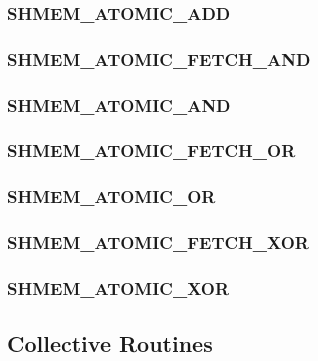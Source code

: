 \documentclass[10pt]{book}
\begin{document}
\subsubsection{\textbf{SHMEM\_ATOMIC\_ADD}}
\label{subsec:shmem_atomic_add}


\subsubsection{\textbf{SHMEM\_ATOMIC\_FETCH\_AND}}
\label{subsec:shmem_atomic_fetch_and}


\subsubsection{\textbf{SHMEM\_ATOMIC\_AND}}
\label{subsec:shmem_atomic_and}


\subsubsection{\textbf{SHMEM\_ATOMIC\_FETCH\_OR}}
\label{subsec:shmem_atomic_fetch_or}


\subsubsection{\textbf{SHMEM\_ATOMIC\_OR}}
\label{subsec:shmem_atomic_or}


\subsubsection{\textbf{SHMEM\_ATOMIC\_FETCH\_XOR}}
\label{subsec:shmem_atomic_fetch_xor}


\subsubsection{\textbf{SHMEM\_ATOMIC\_XOR}}
\label{subsec:shmem_atomic_xor}






\subsection{Collective Routines}\label{subsec:coll}

\end{document}
